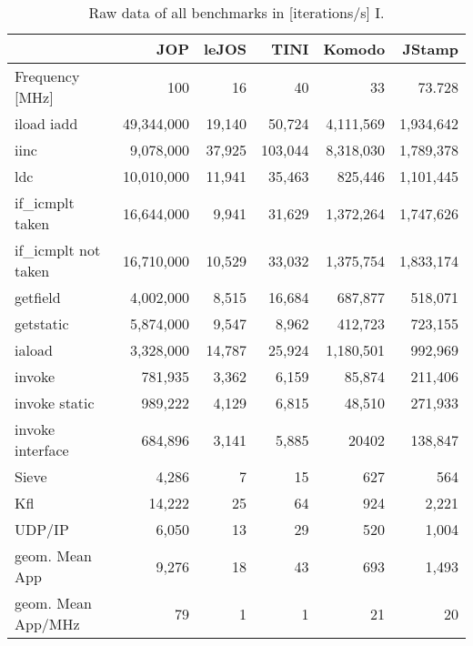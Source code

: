 %



\begin{table}[htb]
    \centering
{\small
    \begin{tabular}{lrrrrr}
        \toprule

& JOP & leJOS & TINI & Komodo & JStamp \\
        \midrule
Frequency [MHz] & 100 & 16 & 40 & 33 & 73.728 \\
        \midrule
iload iadd  & 49,344,000 & 19,140 & 50,724 & 4,111,569 & 1,934,642 \\
iinc          & 9,078,000 & 37,925 & 103,044 & 8,318,030 & 1,789,378 \\
ldc           & 10,010,000 & 11,941 & 35,463 & 825,446 & 1,101,445 \\
if\_icmplt taken & 16,644,000 & 9,941 & 31,629 & 1,372,264 & 1,747,626 \\
if\_icmplt not taken & 16,710,000 & 10,529 & 33,032 & 1,375,754 & 1,833,174 \\
getfield & 4,002,000 & 8,515 & 16,684 & 687,877 & 518,071 \\
getstatic & 5,874,000 & 9,547 & 8,962 & 412,723 & 723,155 \\
iaload & 3,328,000 & 14,787 & 25,924 & 1,180,501 & 992,969 \\
invoke        & 781,935 & 3,362 & 6,159 & 85,874 & 211,406 \\
invoke static & 989,222 & 4,129 & 6,815 & 48,510 & 271,933 \\
invoke interface & 684,896 & 3,141 & 5,885 & 20402 & 138,847 \\
Sieve & 4,286 & 7 & 15 & 627 & 564 \\
Kfl & 14,222 & 25 & 64 & 924 & 2,221 \\
UDP/IP & 6,050 & 13 & 29 & 520 & 1,004 \\
        \midrule
geom. Mean App & 9,276 & 18 & 43 & 693 & 1,493 \\
        \midrule
geom. Mean App/MHz & 79 & 1 & 1 & 21 & 20 \\
        \bottomrule
    \end{tabular}
}
    \caption{Raw data of all benchmarks in [iterations/s] I.}
    \label{tab:appendix:bench:all1}

\end{table}

